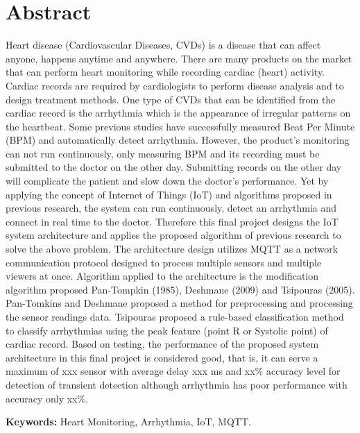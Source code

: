 \chapter*{Abstract}

Heart disease (Cardiovascular Diseases, CVDs) is a disease that can affect anyone, happens anytime and anywhere. There are many products on the market that can perform heart monitoring while recording cardiac (heart) activity. Cardiac records are required by cardiologists to perform disease analysis and to design treatment methods. One type of CVDs that can be identified from the cardiac record is the arrhythmia which is the appearance of irregular patterns on the heartbeat. Some previous studies have successfully measured Beat Per Minute (BPM) and automatically detect arrhythmia. However, the product's monitoring can not run continuously, only measuring BPM and its recording must be submitted to the doctor on the other day. Submitting records on the other day will complicate the patient and slow down the doctor's performance. Yet by applying the concept of Internet of Things (IoT) and algorithms proposed in previous research, the system can run continuously, detect an arrhythmia and connect in real time to the doctor. Therefore this final project designs the IoT system architecture and applies the proposed algorithm of previous research to solve the above problem. The architecture design utilizes MQTT as a network communication protocol designed to process multiple sensors and multiple viewers at once. Algorithm applied to the architecture is the modification algorithm proposed Pan-Tompkin (1985), Deshmane (2009) and Tsipouras (2005). Pan-Tomkins and Deshmane proposed a method for preprocessing and processing the sensor readings data. Tsipouras proposed a rule-based classification method to classify arrhythmias using the peak feature (point R or Systolic point) of cardiac record. Based on testing, the performance of the proposed system architecture in this final project is considered good, that is, it can serve a maximum of xxx sensor with average delay xxx ms and xx\% accuracy level for detection of transient detection although arrhythmia has poor performance with accuracy only xx\%.

\vspace{0.5 cm}
\begin{flushleft}
{\textbf{Keywords:} Heart Monitoring, Arrhythmia, IoT, MQTT.}
\end{flushleft}